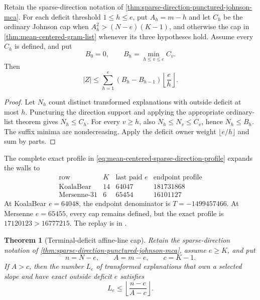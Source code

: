 \documentclass[11pt,a4paper]{amsart}
\numberwithin{equation}{section}
\newtheorem{theorem}{Theorem}[section]
\theoremstyle{remark}
\begin{document}
\begin{corollary}
\label{cor:mean-centered-sparse-direction-profile}
Retain the sparse-direction notation of
\cref{thm:sparse-direction-punctured-johnson-mca}.  For each deficit
threshold \(1\le h\le e\), put \(A_h=m-h\) and let \(C_h\) be the
ordinary Johnson cap when \(A_h^2>(N-e)(K-1)\), and otherwise the cap in
\cref{thm:mean-centered-gram-list} whenever its three hypotheses hold.
Assume every \(C_h\) is defined, and put
\[
 B_0=0,
 \qquad
 B_h=\min_{h\le v\le e}C_v.
\]
Then
\begin{equation}
 |Z|\le\sum_{h=1}^e(B_h-B_{h-1})
                    \left\lfloor\frac eh\right\rfloor.
 \label{eq:mean-centered-sparse-direction-profile}
\end{equation}
\end{corollary}

\begin{proof}
Let \(N_h\) count distinct transformed explanations with outside deficit at
most \(h\).  Puncturing the direction support and applying the appropriate
ordinary-list theorem gives \(N_h\le C_h\).  For every \(v\ge h\), also
\(N_h\le N_v\le C_v\), hence \(N_h\le B_h\).  The suffix minima are
nondecreasing.  Apply the deficit owner weight \(\lfloor e/h\rfloor\) and
sum by parts.
\end{proof}

\begin{remark}
The complete exact profile in
\eqref{eq:mean-centered-sparse-direction-profile} expands the walls to
\[
\begin{array}{c|c|c|c}
\text{row}&K&\text{last paid }e&\text{endpoint profile}\\ \hline
\text{KoalaBear}&14&64047&181731868\\
\text{Mersenne-31}&6&65454&16101127
\end{array}
\]
At KoalaBear \(e=64048\), the endpoint denominator is
\(T=-1499457466\).  At Mersenne \(e=65455\), every cap remains defined,
but the exact profile is \(17120123>16777215\).  The replay is in
.
\end{remark}

\begin{theorem}[Terminal-deficit affine-line cap]
\label{thm:terminal-deficit-affine-line}
Retain the sparse-direction notation of
\cref{thm:sparse-direction-punctured-johnson-mca}, assume \(e\ge K\), and
put
\[
 n=N-e,
 \qquad A=m-e,
 \qquad c=K-1.
\]
If \(A>c\), then the number \(L_e\) of transformed explanations that own a
selected slope and have exact outside deficit \(e\) satisfies
\begin{equation}
 L_e\le\left\lfloor\frac{n-c}{A-c}\right\rfloor.
 \label{eq:terminal-deficit-affine-line}
\end{equation}
\end{theorem}
\end{document}
